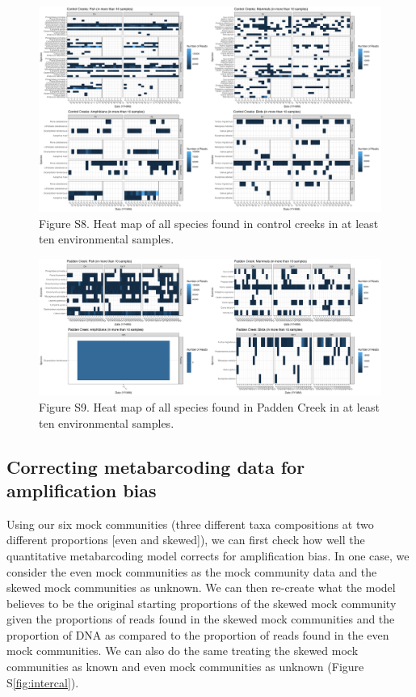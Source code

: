 \documentclass[
]{article}
\begin{document}
\begin{figure}
\centering
\includegraphics{../Output/SupplementalFigures/ALLTAXA_controls.png}
\caption{Figure S8. Heat map of all species found in control creeks in
at least ten environmental samples.\label{fig:controlreads}}
\end{figure}

\begin{figure}
\centering
\includegraphics{../Output/SupplementalFigures/ALLTAXA_padden.png}
\caption{Figure S9. Heat map of all species found in Padden Creek in at
least ten environmental samples.\label{fig:paddenreads}}
\end{figure}

\hypertarget{correcting-metabarcoding-data-for-amplification-bias}{%
\subsection{Correcting metabarcoding data for amplification
bias}\label{correcting-metabarcoding-data-for-amplification-bias}}

Using our six mock communities (three different taxa compositions at two
different proportions {[}even and skewed{]}), we can first check how
well the quantitative metabarcoding model corrects for amplification
bias. In one case, we consider the even mock communities as the mock
community data and the skewed mock communities as unknown. We can then
re-create what the model believes to be the original starting
proportions of the skewed mock community given the proportions of reads
found in the skewed mock communities and the proportion of DNA as
compared to the proportion of reads found in the even mock communities.
We can also do the same treating the skewed mock communities as known
and even mock communities as unknown (Figure S\ref{fig:intercal}).
\end{document}
